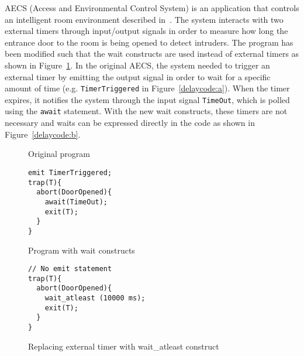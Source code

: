 AECS (Access and Environmental Control System) is an application that
controls an intelligent room environment described
in~\cite{aecs_ispa}. The system interacts with two external timers
through input/output signals in order to measure how long the entrance
door to the room is being opened to detect intruders.  The program has
been modified such that the wait constructs are used instead of external
timers as shown in Figure~\ref{delaycode}. In the original AECS, the
system needed to trigger an external timer by emitting the output signal
in order to wait for a specific amount of time (e.g.
\texttt{TimerTriggered} in Figure~\ref{delaycode:a}). When the timer
expires, it notifies the system through the input signal
\texttt{TimeOut}, which is polled using the \texttt{await}
statement. With the new wait constructs, these timers are not necessary
and waits can be expressed directly in the code as shown in
Figure~\ref{delaycode:b}.

\begin{figure}[h!]
	\vspace{-10pt}
	\centering
  \begin{SubFloat}{\label{delaycode:a}Original program}
      \scriptsize
		\begin{lstlisting}[style=sysj,morekeywords={abort,await,emit,present,trap,pause,exit,suspend}]
emit TimerTriggered;
trap(T){
  abort(DoorOpened){
    await(TimeOut);
    exit(T); 
  }
}
\end{lstlisting}
  \end{SubFloat}
  \hspace{1cm}%
  \begin{SubFloat}{\label{delaycode:b}Program with wait constructs}
		\begin{lstlisting}[style=sysj,morekeywords={abort,await,emit,present,trap,pause,exit,wait_atleast,suspend}]
// No emit statement
trap(T){
  abort(DoorOpened){
    wait_atleast (10000 ms);
    exit(T);  
  }
}
\end{lstlisting}
	\end{SubFloat}
\caption{Replacing external timer with wait\_atleast construct}
\label{delaycode}
\end{figure}




